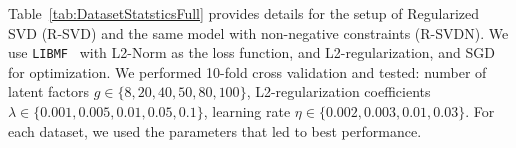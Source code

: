 \fi

Table~\ref{tab:DatasetStatsticsFull} provides details for the setup of Regularized SVD (R-SVD) and the same model with non-negative constraints (R-SVDN). We use \texttt{LIBMF}~\cite{zhuang2013fast} with  L2-Norm as the loss function, and L2-regularization,  and SGD for optimization. We performed 10-fold cross validation and tested:  number of latent factors  $g \in \{8,  20, 40, 50, 80, 100\}$, L2-regularization coefficients  $\lambda \in \{0.001, 0.005, 0.01, 0.05, 0.1\}$,  learning rate $\eta \in \{0.002,0.003,0.01, 0.03\}$. For each dataset, we used the parameters that led to best performance.

